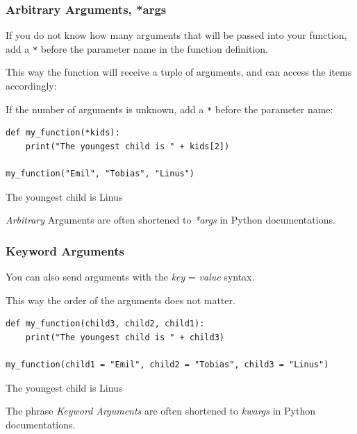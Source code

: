 \documentclass[12pt,a4paper]{article}
\newcommand{\code}[1]{%
	\colorbox{backcolour}{\lstinline{#1}}%
}
\newcommand{\lcode}[1]{%
	\lstinline{#1}%
}
\begin{document}
\subsubsection{Arbitrary Arguments, *args}

If you do not know how many arguments that will be passed into your function,
add a \code{*} before the parameter name in the function definition.

This way the function will receive a tuple of arguments, and can access the
items accordingly:

\begin{ebox}
If the number of arguments is unknown, add a \lcode{*} before the parameter name:
	\begin{lstlisting}
def my_function(*kids):
    print("The youngest child is " + kids[2])

my_function("Emil", "Tobias", "Linus")
	\end{lstlisting}
\tcblower
	\begin{vercode}
The youngest child is Linus
	\end{vercode}
\end{ebox}

\begin{nbox}
	\textit{Arbitrary} Arguments are often shortened to \textit{*args} in Python documentations.
\end{nbox}
\subsubsection{Keyword Arguments}

You can also send arguments with the \textit{key} = \textit{value} syntax.

This way the order of the arguments does not matter.

\begin{ebox}
	\begin{lstlisting}
def my_function(child3, child2, child1):
    print("The youngest child is " + child3)

my_function(child1 = "Emil", child2 = "Tobias", child3 = "Linus")
	\end{lstlisting}
\tcblower
	\begin{vercode}
The youngest child is Linus
	\end{vercode}
\end{ebox}

\begin{nbox}
The phrase \textit{Keyword Arguments} are often shortened to
\textit{kwargs} in Python documentations.
\end{nbox}
\end{document}
